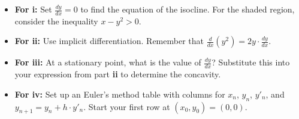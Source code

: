 \begin{hint}
\begin{itemize}
    \item \textbf{For i:} Set $\frac{dy}{dx} = 0$ to find the equation of the isocline. For the shaded region, consider the inequality $x - y^2 > 0$.
    \item \textbf{For ii:} Use implicit differentiation. Remember that $\frac{d}{dx}(y^2) = 2y \cdot \frac{dy}{dx}$. 
    \item \textbf{For iii:} At a stationary point, what is the value of $\frac{dy}{dx}$? Substitute this into your expression from part \textbf{ii} to determine the concavity.
    \item \textbf{For iv:} Set up an Euler's method table with columns for $x_n$, $y_n$, $y'_n$, and $y_{n+1} = y_n + h \cdot y'_n$. Start your first row at $(x_0, y_0) = (0,0)$.
\end{itemize}
\end{hint}

